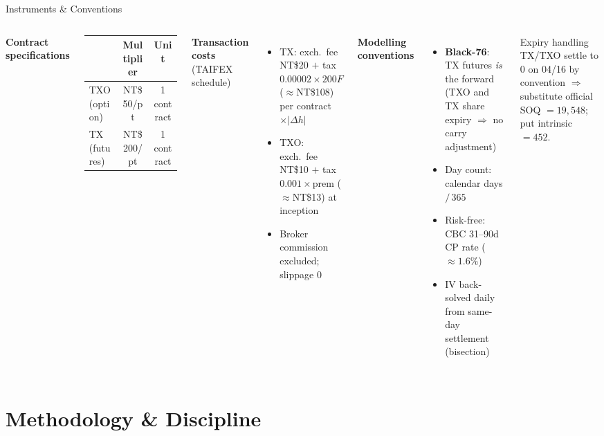 \documentclass[aspectratio=169,t]{beamer}
\newcommand{\nt}[1]{NT\$#1}
\begin{document}
\begin{frame}{Instruments \& Conventions}
  \begin{columns}[T]
      \textbf{Contract specifications}
      \vspace{0.3em}
      \begin{tabular}{lcc}
        \toprule
        & \textbf{Multiplier} & \textbf{Unit} \\
        \midrule
        TXO (option) & \nt{50}/pt & 1 contract \\
        TX (futures) & \nt{200}/pt & 1 contract \\
        \bottomrule
      \end{tabular}
      \vspace{0.8em}

      \textbf{Transaction costs} (TAIFEX schedule)
      \begin{itemize}\small
        \item TX: exch.\ fee \nt{20} $+$ tax $0.00002{\times}200F$ ($\approx$\nt{108}) per contract $\times|\Delta h|$
        \item TXO: exch.\ fee \nt{10} $+$ tax $0.001{\times}$prem ($\approx$\nt{13}) at inception
        \item Broker commission excluded; slippage 0
      \end{itemize}
      \textbf{Modelling conventions}
      \begin{itemize}\small
        \item \textbf{Black-76}: TX futures \emph{is} the forward (TXO and TX share expiry $\Rightarrow$ no carry adjustment)
        \item Day count: calendar days $/\,365$
        \item Risk-free: CBC 31--90d CP rate ($\approx 1.6\%$)
        \item IV back-solved daily from same-day settlement (bisection)
      \end{itemize}
      \begin{block}{Expiry handling}
        \small TX/TXO settle to 0 on 04/16 by convention $\Rightarrow$ substitute official SOQ $=19{,}548$; put intrinsic $=452$.
      \end{block}
  \end{columns}
\end{frame}

\section{Methodology \& Discipline}
\end{document}

